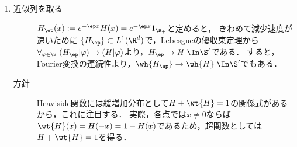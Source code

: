\documentclass[uplatex,dvipdfmx]{jsreport}
\begin{document}
\begin{Proof}\mbox{}
    \begin{enumerate}
        \item 
        \begin{description}
            \item[近似列を取る] $H_\ep(x):=e^{-\ep x}H(x)=e^{-\ep x}1_{\R_+}$と定めると，
            きわめて減少速度が速いために
            $\{H_\ep\}\subset L^1(\R^d)$で，Lebesgueの優収束定理から$\forall_{\varphi\in\S}\;(H_\ep|\varphi)\to(H|\varphi)$より，$H_\ep\to H\;\In\S'$である．
            すると，
            Fourier変換の連続性より，$\wh{H_\ep}\to\wh{H}\;\In\S'$でもある．
            \item[方針] Heaviside関数には緩増加分布として$H+\wt{H}=1$の関係式があるから，これに注目する．
            実際，各点では$x\ne0$ならば$\wt{H}(x)=H(-x)=1-H(x)$であるため，超関数としては$H+\wt{H}=1$を得る．


\end{description}
\end{enumerate}
\end{Proof}
\end{document}
